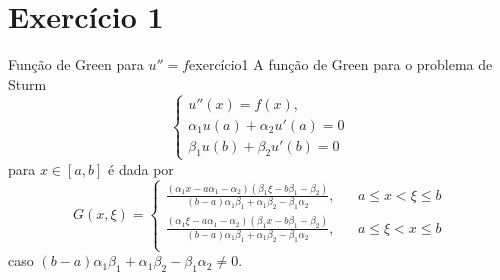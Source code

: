 \section*{Exercício 1}
\begin{proposition}{Função de Green para \(u'' = f\)}{exercício1}
    A função de Green para o problema de Sturm
    \begin{equation*}
        \begin{cases}
            u''(x) = f(x),\\
            \alpha_1u(a) + \alpha_2u'(a) = 0\\
            \beta_1u(b) + \beta_2u'(b) = 0
        \end{cases}
    \end{equation*}
    para \(x \in [a,b]\) é dada por
    \begin{equation*}
        G(x,\xi) = \left\{\begin{aligned}
                \frac{(\alpha_1 x - a \alpha_1 - \alpha_2)(\beta_1 \xi - b \beta_1 - \beta_2)}{(b - a)\alpha_1 \beta_1 + \alpha_1 \beta_2 - \beta_1 \alpha_2},&& a \leq x < \xi \leq b\\
                \frac{(\alpha_1 \xi - a \alpha_1 - \alpha_2)(\beta_1 x - b \beta_1 - \beta_2)}{(b - a)\alpha_1 \beta_1 + \alpha_1 \beta_2 - \beta_1 \alpha_2}, && a \leq \xi < x \leq b\\
        \end{aligned}\right.
    \end{equation*}
    caso \((b - a)\alpha_1 \beta_1 + \alpha_1 \beta_2 - \beta_1 \alpha_2 \neq 0\).
\end{proposition}
